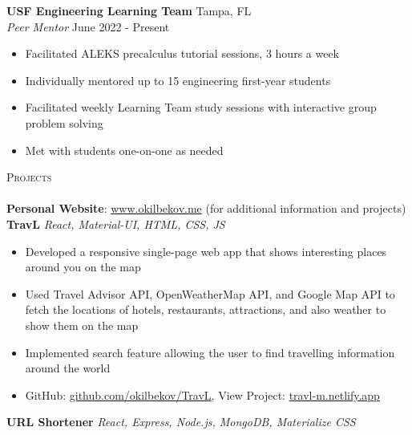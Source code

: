 \documentclass[a4paper]{article}
\newcommand{\lineunder} {
    \vspace*{-8pt} \\
    \hspace*{-18pt} \hrulefill \\
}
\newcommand{\header} [1] {
    {\hspace*{-18pt}\vspace*{6pt} \textsc{#1}}
    \vspace*{-6pt} \lineunder
}
\begin{document}
\textbf{USF Engineering Learning Team} \hfill Tampa, FL\\
\textit{Peer Mentor} \hfill June 2022 - Present\\
\vspace{-2mm}
\begin{itemize} \itemsep 1pt
	\item Facilitated ALEKS precalculus tutorial sessions, 3 hours a week
	\vspace{-2mm}
	\item Individually mentored up to 15 engineering first-year students
	\vspace{-2mm}
	\item Facilitated weekly Learning Team study sessions with interactive group problem solving
	\vspace{-2mm}
	\item Met with students one-on-one as needed
\end{itemize}
{\Large \header{Projects}}
{\textbf{Personal Website}}: \href{www.okilbekov.me}{www.okilbekov.me} (for additional information and projects) \\
{\textbf{TravL}} {\sl React, Material-UI, HTML, CSS, JS}\\
\vspace{-2mm}
\begin{itemize} \itemsep 1pt
	\item Developed a responsive single-page web app that shows interesting places around you on the map
	\vspace{-2mm}
	\item Used Travel Advisor API, OpenWeatherMap API, and Google Map API to fetch the locations of hotels, restaurants, attractions, and also weather to show them on the map
	\vspace{-2mm}
	\item Implemented search feature allowing the user to find travelling information around the world
	\vspace{-2mm}
	\item GitHub: \href{https://github.com/okilbekov/TravL}{github.com/okilbekov/TravL}, View Project: \href{https://travl-m.netlify.app}{travl-m.netlify.app}
\end{itemize}
{\textbf{URL Shortener}} {\sl React, Express, Node.js, MongoDB, Materialize CSS} \\
\vspace{-2mm}
\end{document}
